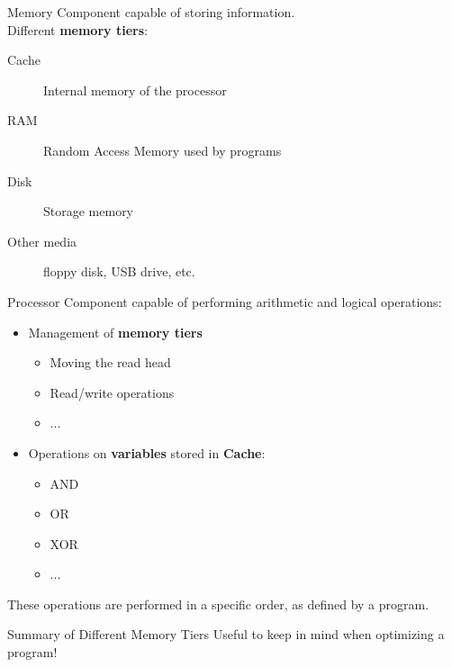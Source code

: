 \begin{frame}{Memory}
    Component capable of storing information. \\
    \newline
    Different \textbf{memory tiers}:
    \begin{description}
        \item[Cache] Internal memory of the processor
        \item[RAM] Random Access Memory used by programs
        \item[Disk] Storage memory
        \item[Other media] floppy disk, USB drive, etc.
    \end{description}
\end{frame}

\begin{frame}{Processor}
    Component capable of performing arithmetic and logical operations:
    \begin{itemize}
        \item Management of \textbf{memory tiers}
        \begin{itemize}
            \item Moving the read head
            \item Read/write operations
            \item ...
        \end{itemize}
        \item Operations on \textbf{variables} stored in \textbf{Cache}:
        \begin{itemize}
            \item AND
            \item OR
            \item XOR
            \item ...
        \end{itemize}
    \end{itemize}
    These operations are performed in a specific order, as defined by a program.
\end{frame}

\begin{frame}{Summary of Different Memory Tiers}
    Useful to keep in mind when optimizing a program!
\end{frame}